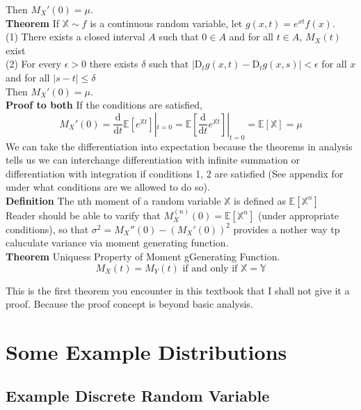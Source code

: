 \documentclass[a4paper,12pt]{article}
\begin{document}
Then $M_X'(0) = \mu$.\\

\textbf{Theorem} If $\mathbb{X} \sim f$ is a continuous random variable, let $g(x, t) = e^{x t}f(x)$.\\
(1) There exists a closed interval $A$ such that $0 \in A$ and for all $t \in A$, $M_X(t)$ exist\\
(2) For every $\epsilon > 0$ there exists $\delta$ such that $| \mathrm{D}_t g(x, t) - \mathrm{D}_t g(x, s) | < \epsilon$ for all $x$ and for all $|s-t|\leq\delta$\\

Then $M_X'(0) = \mu$.\\

\textbf{Proof to both} If the conditions are satisfied,
$$M_X'(0) = \frac{\mathrm{d}}{\mathrm{d} t}\mathbb{E}[e^{\mathbb{X}t}] |_{t=0} = \mathbb{E}[ \frac{\mathrm{d}}{\mathrm{d} t} e^{\mathbb{X}t}] |_{t=0} = \mathbb{E}[\mathbb{X}] = \mu$$
We can take the differentiation into expectation because the theorems in analysis tells us we can interchange differentiation with infinite summation or differentiation with integration if conditions 1, 2 are satisfied (See appendix for under what conditions are we allowed to do so).\\

\textbf{Definition} The nth moment of a random variable $\mathbb{X}$ is defined as $\mathbb{E}[\mathbb{X}^n]$\\

Reader should be able to varify that $M_X^{(n)}(0) = \mathbb{E}[\mathbb{X}^n]$ (under appropriate conditions), so that $\sigma^2 = M_X''(0) - (M_X'(0))^2$ provides a nother way tp caluculate variance via moment generating function.\\

\textbf{Theorem} Uniquess Property of Moment gGenerating Function.
$$M_X(t) = M_Y(t) \text{ if and only if } \mathbb{X}=\mathbb{Y}$$

This is the first theorem you encounter in this textbook that I shall not give it a proof. Because the proof concept is beyond basic analysis.


\newpage
\section{Some Example Distributions}
\subsection{Example Discrete Random Variable}
\end{document}
